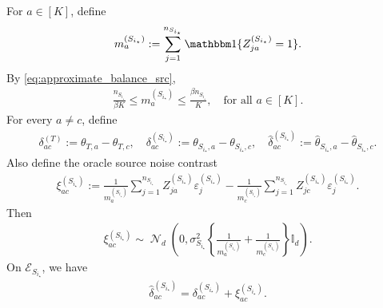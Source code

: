 \documentclass[10pt]{article}
\newcommand{\Id}{\mathbb I}
\newcommand{\wh}{\widehat}
\DeclareMathOperator{\dnorm}{\mathcal N}
\newcommand{\trg}{T}
\newcommand{\thetamcT}[1]{\theta_{\trg,#1}}
\newcommand{\src}{S}
\newcommand{\nSm}[1]{n_{\src_{#1}}}
\newcommand{\sigmaSm}[1]{\sigma_{\src_{#1}}}
\newcommand{\Zsrcm}[1]{Z^{(\src_{#1})}}
\newcommand{\thetamSS}[2]{\theta_{\src_{#1},#2}}
\newcommand{\epsm}[1]{\varepsilon^{(\src_{#1})}}
\begin{document}
For $a\in[K]$, define
\begin{align}
\label{eq:source_high_dim_cluster_sizes}
    m_a^{(\src_{i_\star})}:=\sum_{j=1}^{\nSm{i_\star}}\mathbbm 1\{\Zsrcm{i_\star}_{ja}=1\}.
\end{align}
By \eqref{eq:approximate_balance_src},
\begin{align}
\label{eq:source_high_dim_balance}
    \frac{\nSm{i_\star}}{\beta K}\le m_a^{(\src_{i_\star})}\le \frac{\beta\nSm{i_\star}}{K}, \quad \mbox{for all $a\in[K]$.}
\end{align}
For every $a\neq c$, define
\begin{align}
\label{eq:source_high_dim_contrasts}
    \delta_{ac}^{(\trg)}:=\thetamcT{a}-\thetamcT{c}, \quad \delta_{ac}^{(\src_{i_\star})}:=\thetamSS{i_\star}{a}-\thetamSS{i_\star}{c}, \quad \widehat\delta_{ac}^{(\src_{i_\star})}:=\wh{\theta}_{\src_{i_\star},a}-\wh{\theta}_{\src_{i_\star},c}.
\end{align}
Also define the oracle source noise contrast
\begin{align}
\label{eq:source_high_dim_noise_contrast}
    \xi_{ac}^{(\src_{i_\star})}:=\frac{1}{m_a^{(\src_{i_\star})}}\sum_{j=1}^{\nSm{i_\star}}\Zsrcm{i_\star}_{ja}\epsm{i_\star}_j-\frac{1}{m_c^{(\src_{i_\star})}}\sum_{j=1}^{\nSm{i_\star}}\Zsrcm{i_\star}_{jc}\epsm{i_\star}_j.
\end{align}
Then
\begin{align}
\label{eq:source_high_dim_noise_contrast_dist}
    \xi_{ac}^{(\src_{i_\star})}\sim\dnorm_d\left(0,\sigmaSm{i_\star}^2\left\{\frac{1}{m_a^{(\src_{i_\star})}}+\frac{1}{m_c^{(\src_{i_\star})}}\right\}\Id_d\right).
\end{align}
On $\mathcal E_{\src_{i_\star}}$, we have
\begin{align}
\label{eq:source_high_dim_empirical_contrast_decomp}
    \widehat\delta_{ac}^{(\src_{i_\star})}=\delta_{ac}^{(\src_{i_\star})}+\xi_{ac}^{(\src_{i_\star})}.
\end{align}
\end{document}

